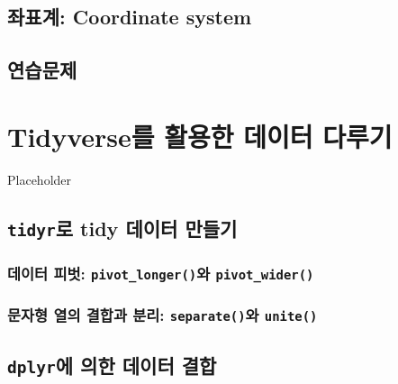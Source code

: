 \documentclass[
]{book}
\begin{document}
\hypertarget{uxc88cuxd45cuxacc4-coordinate-system}{%
\section{좌표계: Coordinate system}\label{uxc88cuxd45cuxacc4-coordinate-system}}

\hypertarget{uxc5f0uxc2b5uxbb38uxc81c-1}{%
\section{연습문제}\label{uxc5f0uxc2b5uxbb38uxc81c-1}}

\hypertarget{ch6}{%
\chapter{Tidyverse를 활용한 데이터 다루기}\label{ch6}}

Placeholder

\hypertarget{tidyruxb85c-tidy-uxb370uxc774uxd130-uxb9ccuxb4e4uxae30}{%
\section{\texorpdfstring{\texttt{tidyr}로 tidy 데이터 만들기}{tidyr로 tidy 데이터 만들기}}\label{tidyruxb85c-tidy-uxb370uxc774uxd130-uxb9ccuxb4e4uxae30}}

\hypertarget{uxb370uxc774uxd130-uxd53cuxbc97-pivot_longeruxc640-pivot_wider}{%
\subsection{\texorpdfstring{데이터 피벗: \texttt{pivot\_longer()}와 \texttt{pivot\_wider()}}{데이터 피벗: pivot\_longer()와 pivot\_wider()}}\label{uxb370uxc774uxd130-uxd53cuxbc97-pivot_longeruxc640-pivot_wider}}

\hypertarget{uxbb38uxc790uxd615-uxc5f4uxc758-uxacb0uxd569uxacfc-uxbd84uxb9ac-separateuxc640-unite}{%
\subsection{\texorpdfstring{문자형 열의 결합과 분리: \texttt{separate()}와 \texttt{unite()}}{문자형 열의 결합과 분리: separate()와 unite()}}\label{uxbb38uxc790uxd615-uxc5f4uxc758-uxacb0uxd569uxacfc-uxbd84uxb9ac-separateuxc640-unite}}

\hypertarget{dplyruxc5d0-uxc758uxd55c-uxb370uxc774uxd130-uxacb0uxd569}{%
\section{\texorpdfstring{\texttt{dplyr}에 의한 데이터 결합}{dplyr에 의한 데이터 결합}}\label{dplyruxc5d0-uxc758uxd55c-uxb370uxc774uxd130-uxacb0uxd569}}
\end{document}
